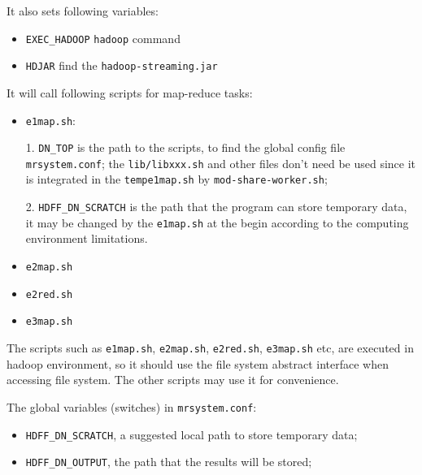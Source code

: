 \begin{itemize}
\begin{itemize}
\begin{itemize}
          It also sets following variables:
            \begin{itemize}
              \item \texttt{EXEC\_HADOOP} \texttt{hadoop} command
              \item \texttt{HDJAR} find the \texttt{hadoop-streaming.jar}
            \end{itemize}


          It will call following scripts for map-reduce tasks:
            \begin{itemize}
              \item \texttt{e1map.sh}:

                1. \texttt{DN\_TOP} is the path to the scripts, to find the global config file \texttt{mrsystem.conf}; the \texttt{lib/libxxx.sh} and other files don't need be used since it is integrated in the \texttt{tempe1map.sh} by \texttt{mod-share-worker.sh};

                2. \texttt{HDFF\_DN\_SCRATCH} is the path that the program can store temporary data, it may be changed by the \texttt{e1map.sh} at the begin according to the computing environment limitations.

              \item \texttt{e2map.sh}
              \item \texttt{e2red.sh}
              \item \texttt{e3map.sh}
            \end{itemize}
        \end{itemize}

    \end{itemize}

\end{itemize}



The scripts such as \texttt{e1map.sh}, \texttt{e2map.sh}, \texttt{e2red.sh}, \texttt{e3map.sh} etc,
are executed in hadoop environment, so it should use the file system abstract interface when accessing file system.
The other scripts may use it for convenience.



The global variables (switches) in \texttt{mrsystem.conf}:
\begin{itemize}
  \item \texttt{HDFF\_DN\_SCRATCH}, a suggested local path to store temporary data;

  \item \texttt{HDFF\_DN\_OUTPUT}, the path that the results will be stored;
\end{itemize}



